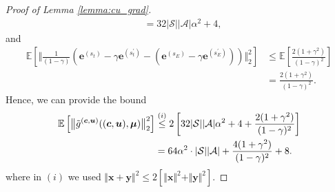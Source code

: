 \documentclass[10pt,a4paper]{amsart}
\def\Ac{\ensuremath{\mathcal{A}}}
\newcommand{\E}{\mathbb{E}}
\newcommand{\St}{\mathcal{S}}
\def\vc{{\bm{c}}}
\def\ve{{\bm{e}}}
\def\vmu{{\bm{\mu}}}
\def\vu{{\bm{u}}}
\def\vx{{\bm{x}}}
\def\vy{{\bm{y}}}
\begin{document}
\begin{proof}[Proof of Lemma \ref{lemma:cu_grad}]
\begin{align*}
            &= 32|\St||\Ac|\alpha^2 + 4,
        \end{align*}
        and 
        \begin{align*}
            \E\left[\Big\Vert \frac{1}{(1-\gamma)}\left( \ve^{(s_t)} - \gamma \ve^{(s_t^\prime)} - (\ve^{(s_E)} - \gamma\ve^{(s_E^\prime)})\right) \Big\Vert_2^2\right] &\leq \E\left[\frac{2(1+\gamma^2)}{(1-\gamma)^2}\right]\\
            &= \frac{2(1+\gamma^2)}{(1-\gamma)^2}.
        \end{align*}
        Hence, we can provide the bound
        \begin{align*}
            \E\left[ \big\Vert \Tilde{g}^{(\vc,\vu)}((\vc,\vu),\vmu) \big\Vert^2_2 \right]
            &\stackrel{(i)}{\leq} 2\left[ 32|\St||\Ac|\alpha^2 + 4 + \frac{2(1+\gamma^2)}{(1-\gamma)^2}\right] \\
            &= 64\alpha^2\cdot |\St||\Ac| + \frac{4(1+\gamma^2)}{(1-\gamma)^2} + 8.
        \end{align*}
        where in $(i)$ we used $\Vert \vx+ \vy\Vert^2 \leq 2[\Vert \vx \Vert^2 + \Vert \vy \Vert^2]$.
     \end{proof}
\end{document}
